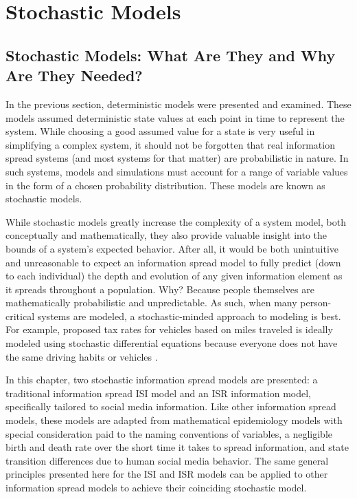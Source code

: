 \chapter{Stochastic Models}

\section{Stochastic Models: What Are They and Why Are They Needed?}
In the previous section, deterministic models were presented and examined. These models assumed deterministic state values at each point in time to represent the system. While choosing a good assumed value for a state is very useful in simplifying a complex system, it should not be forgotten that real information spread systems (and most systems for that matter) are probabilistic in nature. In such systems, models and simulations must account for a range of variable values in the form of a chosen probability distribution. These models are known as stochastic models. 

While stochastic models greatly increase the complexity of a system model, both conceptually and mathematically, they also provide valuable insight into the bounds of a system's expected behavior. After all, it would be both unintuitive and unreasonable to expect an information spread model to fully predict (down to each individual) the depth and evolution of any given information element as it spreads throughout a population. Why? Because people themselves are mathematically probabilistic and unpredictable. As such, when many person-critical systems are modeled, a stochastic-minded approach to modeling is best. For example, proposed tax rates for vehicles based on miles traveled is ideally modeled using stochastic differential equations because everyone does not have the same driving habits or vehicles \cite{verma2016modeling}.

In this chapter, two stochastic information spread models are presented: a traditional information spread ISI model and an ISR information model, specifically tailored to social media information. Like other information spread models, these models are adapted from mathematical epidemiology models \cite{allen2008mathematical} with special consideration paid to the naming conventions of variables, a negligible birth and death rate over the short time it takes to spread information, and state transition differences due to human social media behavior. The same general principles presented here for the ISI and ISR models can be applied to other information spread models to achieve their coinciding stochastic model.

